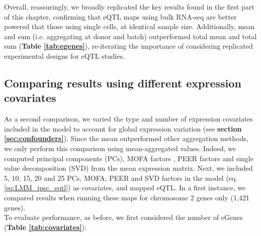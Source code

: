 Overall, reassuringly, we broadly replicated the key results found in the first part of this chapter, confirming that eQTL maps using bulk RNA-seq are better powered that those using single cells, at identical sample size.
Additionally, mean and sum (i.e. aggregating at donor and batch) outperformed total mean and total sum (\textbf{Table \ref{tab:egenes}}), re-iterating the importance of considering replicated experimental designs for eQTL studies.



\subsection{Comparing results using different expression covariates}


As a second comparison, we varied the type and number of expression covariates included in the model to account for global expression variation (see \textbf{section 
\ref{sec:confounders}}).
Since the mean outperformed other aggregation methods, we only perform this comparison using mean-aggregated values.
Indeed, we computed principal components (PCs), MOFA factors \cite{argelaguet2018multi}, PEER factors \cite{stegle2010bayesian,stegle2012using} and single value decomposition (SVD) from the mean expression matrix. 
Next, we included 5, 10, 15, 20 and 25 PCs, MOFA, PEER and SVD factors in the model (eq. \eqref{eq:LMM_ipsc_eqtl}) as covariates, and mapped eQTL.
In a first instance, we compared results when running these maps for chromosome 2 genes only (1,421 genes). \\

To evaluate performance, as before, we first considered the number of eGenes (\textbf{Table \ref{tab:covariates}}):




